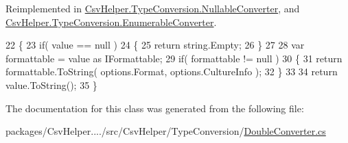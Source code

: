 Reimplemented in \hyperlink{a00116_a7205cdb61d2d119582958232b3e63109}{Csv\-Helper.\-Type\-Conversion.\-Nullable\-Converter}, and \hyperlink{a00078_a7e07e9532857d748654d37db590a0e11}{Csv\-Helper.\-Type\-Conversion.\-Enumerable\-Converter}.


\begin{DoxyCode}
22         \{
23             \textcolor{keywordflow}{if}( value == null )
24             \{
25                 \textcolor{keywordflow}{return} string.Empty;
26             \}
27 
28             var formattable = value as IFormattable;
29             \textcolor{keywordflow}{if}( formattable != null )
30             \{
31                 \textcolor{keywordflow}{return} formattable.ToString( options.Format, options.CultureInfo );
32             \}
33 
34             \textcolor{keywordflow}{return} value.ToString();
35         \}
\end{DoxyCode}


The documentation for this class was generated from the following file\-:\begin{DoxyCompactItemize}
\item 
packages/\-Csv\-Helper..../src/\-Csv\-Helper/\-Type\-Conversion/\hyperlink{a00232}{Double\-Converter.\-cs}\end{DoxyCompactItemize}
